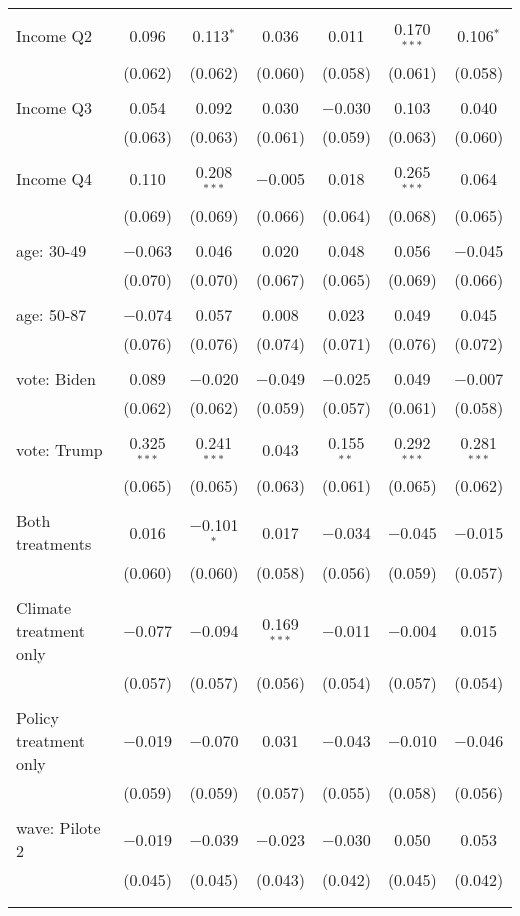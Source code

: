 \begin{tabular}{@{\extracolsep{5pt}}lcccccc}
  & & & & & & \\ 
 Income Q2 & 0.096 & 0.113$^{*}$ & 0.036 & 0.011 & 0.170$^{***}$ & 0.106$^{*}$ \\ 
  & (0.062) & (0.062) & (0.060) & (0.058) & (0.061) & (0.058) \\ 
  & & & & & & \\ 
 Income Q3 & 0.054 & 0.092 & 0.030 & $-$0.030 & 0.103 & 0.040 \\ 
  & (0.063) & (0.063) & (0.061) & (0.059) & (0.063) & (0.060) \\ 
  & & & & & & \\ 
 Income Q4 & 0.110 & 0.208$^{***}$ & $-$0.005 & 0.018 & 0.265$^{***}$ & 0.064 \\ 
  & (0.069) & (0.069) & (0.066) & (0.064) & (0.068) & (0.065) \\ 
  & & & & & & \\ 
 age: 30-49 & $-$0.063 & 0.046 & 0.020 & 0.048 & 0.056 & $-$0.045 \\ 
  & (0.070) & (0.070) & (0.067) & (0.065) & (0.069) & (0.066) \\ 
  & & & & & & \\ 
 age: 50-87 & $-$0.074 & 0.057 & 0.008 & 0.023 & 0.049 & 0.045 \\ 
  & (0.076) & (0.076) & (0.074) & (0.071) & (0.076) & (0.072) \\ 
  & & & & & & \\ 
 vote: Biden & 0.089 & $-$0.020 & $-$0.049 & $-$0.025 & 0.049 & $-$0.007 \\ 
  & (0.062) & (0.062) & (0.059) & (0.057) & (0.061) & (0.058) \\ 
  & & & & & & \\ 
 vote: Trump & 0.325$^{***}$ & 0.241$^{***}$ & 0.043 & 0.155$^{**}$ & 0.292$^{***}$ & 0.281$^{***}$ \\ 
  & (0.065) & (0.065) & (0.063) & (0.061) & (0.065) & (0.062) \\ 
  & & & & & & \\ 
 Both treatments & 0.016 & $-$0.101$^{*}$ & 0.017 & $-$0.034 & $-$0.045 & $-$0.015 \\ 
  & (0.060) & (0.060) & (0.058) & (0.056) & (0.059) & (0.057) \\ 
  & & & & & & \\ 
 Climate treatment only & $-$0.077 & $-$0.094 & 0.169$^{***}$ & $-$0.011 & $-$0.004 & 0.015 \\ 
  & (0.057) & (0.057) & (0.056) & (0.054) & (0.057) & (0.054) \\ 
  & & & & & & \\ 
 Policy treatment only & $-$0.019 & $-$0.070 & 0.031 & $-$0.043 & $-$0.010 & $-$0.046 \\ 
  & (0.059) & (0.059) & (0.057) & (0.055) & (0.058) & (0.056) \\ 
  & & & & & & \\ 
 wave: Pilote 2 & $-$0.019 & $-$0.039 & $-$0.023 & $-$0.030 & 0.050 & 0.053 \\ 
  & (0.045) & (0.045) & (0.043) & (0.042) & (0.045) & (0.042) \\ 
  & & & & & & \\ 
\hline \\[-1.8ex] 


\end{tabular}
